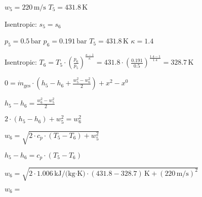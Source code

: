 \( w_5 = 220 \, \text{m/s} \)  
\( T_5 = 431.8 \, \text{K} \)  

Isentropic: \( s_5 = s_6 \)  

\( p_5 = 0.5 \, \text{bar} \)  
\( p_6 = 0.191 \, \text{bar} \)  
\( T_5 = 431.8 \, \text{K} \)  
\( \kappa = 1.4 \)  

Isentropic:  
\( T_6 = T_5 \cdot \left( \frac{p_6}{p_5} \right)^{\frac{\kappa - 1}{\kappa}} = 431.8 \cdot \left( \frac{0.191}{0.5} \right)^{\frac{1.4 - 1}{1.4}} = 328.7 \, \text{K} \)  

\( 0 = \dot{m}_{\text{ges}} \cdot \left( h_5 - h_6 + \frac{w_5^2 - w_6^2}{2} \right) + x^2 - x^0 \)  

\( h_5 - h_6 = \frac{w_6^2 - w_5^2}{2} \)  

\( 2 \cdot (h_5 - h_6) + w_5^2 = w_6^2 \)  

\( w_6 = \sqrt{2 \cdot c_p \cdot (T_5 - T_6) + w_5^2} \)  

\( h_5 - h_6 = c_p \cdot (T_5 - T_6) \)  

\( w_6 = \sqrt{2 \cdot 1.006 \, \text{kJ/(kg·K)} \cdot (431.8 - 328.7) \, \text{K} + (220 \, \text{m/s})^2} \)  

\( w_6 = \)